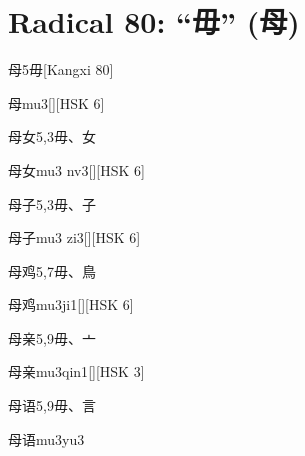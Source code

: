 
\section*{Radical 80: ``⽏'' (母)}

\begin{entry}{母}{5}{⽏}[Kangxi 80]
  \begin{phonetics}{母}{mu3}[][HSK 6]
  \end{phonetics}
\end{entry}

\begin{entry}{母女}{5,3}{⽏、⼥}
  \begin{phonetics}{母女}{mu3 nv3}[][HSK 6]
  \end{phonetics}
\end{entry}

\begin{entry}{母子}{5,3}{⽏、⼦}
  \begin{phonetics}{母子}{mu3 zi3}[][HSK 6]
  \end{phonetics}
\end{entry}

\begin{entry}{母鸡}{5,7}{⽏、⿃}
  \begin{phonetics}{母鸡}{mu3ji1}[][HSK 6]
  \end{phonetics}
\end{entry}

\begin{entry}{母亲}{5,9}{⽏、⼇}
  \begin{phonetics}{母亲}{mu3qin1}[][HSK 3]
  \end{phonetics}
\end{entry}

\begin{entry}{母语}{5,9}{⽏、⾔}
  \begin{phonetics}{母语}{mu3yu3}
  \end{phonetics}
\end{entry}


